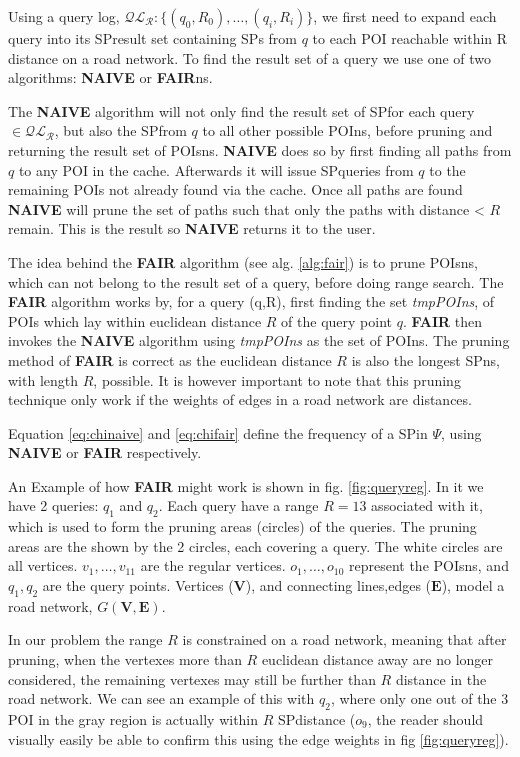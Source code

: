 Using a query log, $\mathcal{QL_R}: \{(q_0,R_0),\dots,(q_i,R_i)\}$, we first need to expand each query into its SPresult set containing SPs from $q$ to each POI reachable within R distance on a road network. 
To find the result set of a query we use one of two algorithms: \textbf{NAIVE} or \textbf{FAIR}ns.

The \textbf{NAIVE} algorithm will not only find the result set of SPfor each query $\in \mathcal{QL_R}$, but also the SPfrom $q$ to all other possible POIns, before pruning and returning the result set of POIsns.
\textbf{NAIVE} does so by first finding all paths from $q$ to any POI in the cache. Afterwards it will issue SPqueries from $q$ to the remaining POIs not already found via the cache. 
Once all paths are found \textbf{NAIVE} will prune the set of paths such that only the paths with distance < $R$ remain. This is the result so \textbf{NAIVE} returns it to the user.

The idea behind the \textbf{FAIR} algorithm (see alg. \ref{alg:fair}) is to prune POIsns, which can not belong to the result set of a query, before doing range search. The \textbf{FAIR} algorithm works by, for a query (q,R), first finding the set {\it tmpPOIns}, of POIs which lay within euclidean distance $R$ of the query point $q$. \textbf{FAIR} then invokes the \textbf{NAIVE} algorithm using {\it tmpPOIns} as the set of POIns.
The pruning method of \textbf{FAIR} is correct as the euclidean distance $R$ is also the longest SPns, with length $R$, possible. It is however important to note that this pruning technique only work if the weights of edges in a road network are distances.

Equation \ref{eq:chinaive} and \ref{eq:chifair} define the frequency of a SPin $\Psi$, using \textbf{NAIVE} or \textbf{FAIR} respectively.

An Example of how \textbf{FAIR} might work is shown in fig. \ref{fig:queryreg}. In it we have 2 queries: $q_1$ and $q_2$. Each query have a range $R=13$ associated with it, which is used to form the pruning areas (circles) of the queries. The pruning areas are the shown by the 2 circles, each covering a query. The  white circles are all vertices. $v_1,\ldots,v_{11}$ are the regular vertices. $o_1,\ldots,o_{10}$ represent the POIsns, and $q_1,q_2$ are the query points. Vertices ($\mathbf{V}$), and connecting lines,edges ($\mathbf{E}$), model a road network, $G\mathbf{(V,E)}$.

In our problem the range $R$ is constrained on a road network, meaning that after pruning, when the vertexes more than $R$ euclidean distance away are no longer considered, the remaining vertexes may still be further than $R$ distance in the road network. 
We can see an example of this with $q_2$, where only one out of the 3 POI in the gray region is actually within $R$ SPdistance ($o_9$, the reader should visually easily be able to confirm this using the edge weights in fig \ref{fig:queryreg}).

